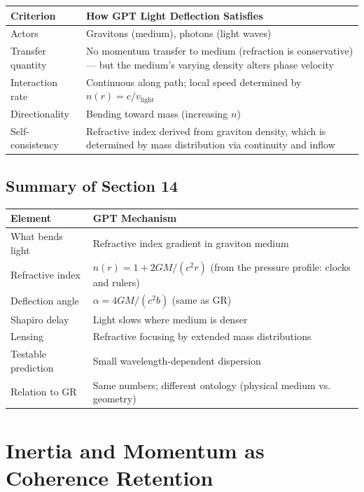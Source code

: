 \documentclass[12pt, a4paper]{article}
\begin{document}
\begin{center}
\begin{tabular}{|p{3.5cm}|p{10cm}|}
\hline
\textbf{Criterion} & \textbf{How GPT Light Deflection Satisfies} \\
\hline
Actors & Gravitons (medium), photons (light waves) \\
\hline
Transfer quantity & No momentum transfer to medium (refraction is conservative) — but the medium's varying density alters phase velocity \\
\hline
Interaction rate & Continuous along path; local speed determined by \( n(r) = c/v_{\text{light}} \) \\
\hline
Directionality & Bending toward mass (increasing \( n \)) \\
\hline
Self-consistency & Refractive index derived from graviton density, which is determined by mass distribution via continuity and inflow \\
\hline
\end{tabular}
\end{center}

\subsection{Summary of Section 14}
\label{subsec:summary_14}

\begin{center}
\begin{tabular}{|p{4cm}|p{10cm}|}
\hline
\textbf{Element} & \textbf{GPT Mechanism} \\
\hline
What bends light & Refractive index gradient in graviton medium \\
\hline
Refractive index & \( n(r) = 1 + 2GM/(c^2 r) \) (from the pressure profile: clocks and rulers) \\
\hline
Deflection angle & \( \alpha = 4GM/(c^2 b) \) (same as GR) \\
\hline
Shapiro delay & Light slows where medium is denser \\
\hline
Lensing & Refractive focusing by extended mass distributions \\
\hline
Testable prediction & Small wavelength-dependent dispersion \\
\hline
Relation to GR & Same numbers; different ontology (physical medium vs. geometry) \\
\hline
\end{tabular}
\end{center}

\section{Inertia and Momentum as Coherence Retention}
\label{sec:inertia_momentum}
\end{document}
